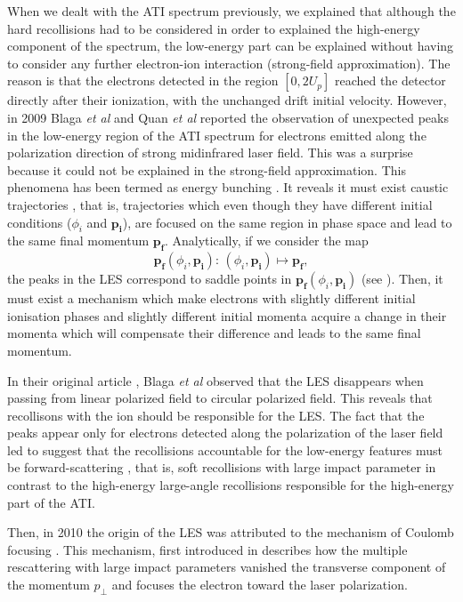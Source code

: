 \documentclass[a4paper]{article}
\begin{document}
When we dealt with the ATI spectrum previously, we explained that although the hard recollisions had to be considered in order to explained the high-energy component of the spectrum, the low-energy part can be explained without having to consider any further electron-ion interaction (strong-field approximation). The reason is that the electrons detected in the region $[0,2U_{p}]$ reached the detector directly after their ionization, with the unchanged drift initial velocity.
However, in 2009 Blaga \textit{et al} \cite{Blaga_2009} and Quan \textit{et al} \cite{Quan_2009} reported the observation of unexpected peaks in the low-energy region of the ATI spectrum for electrons emitted along the polarization direction of strong midinfrared laser field. This was a surprise because it could not be explained in the strong-field approximation. This phenomena has been termed as energy bunching \cite{Kastner_2012_soft}. It reveals it must exist caustic trajectories \cite{Yan_2010}, that is, trajectories which even though they have different initial conditions ($\phi_{i}$ and $\mathbf{p_{i}}$), are focused on the same region in phase space and lead to the same final momentum $\mathbf{p_{f}}$. Analytically, if we consider the map 
\begin{equation}
\mathbf{p_{f}}(\phi_{i},\mathbf{p_{i}}): \, (\phi_{i},\mathbf{p_{i}}) \mapsto \mathbf{p_{f}},
\end{equation}
the peaks in the LES correspond to saddle points in $\mathbf{p_{f}}(\phi_{i},\mathbf{p_{i}})$ (see \cite{Kastner_2012_soft}).
Then, it must exist a mechanism which make electrons with slightly different initial ionisation phases and slightly different initial momenta acquire a change in their momenta which will compensate their difference and leads to the same final momentum.
\par
In their original article \cite{Blaga_2009}, Blaga \textit{et al} observed that the LES disappears when passing from linear polarized field to circular polarized field. This reveals that recollisons with the ion should be responsible for the LES.
The fact that the peaks appear only for electrons detected along the polarization of the laser field led to suggest that the recollisions accountable for the low-energy features must be forward-scattering \cite{Faisal_2009}, that is, soft recollisions with large impact parameter in contrast to the high-energy large-angle recollisions responsible for the high-energy part of the ATI. 
\par 
Then, in 2010 the origin of the LES was attributed to the mechanism of Coulomb focusing \cite{Liu_2010}. This mechanism, first introduced in \cite{Misha_1996} describes how the multiple rescattering with large impact parameters vanished the transverse component of the momentum $p_{\perp}$ and focuses the electron toward the laser polarization.
\end{document}
